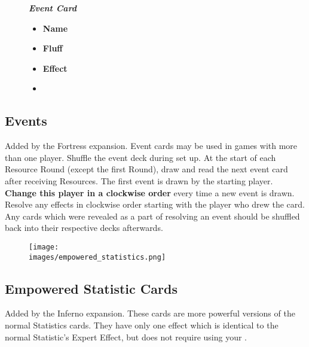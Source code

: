 \begin{wrapfigure}{r}{0.5\textwidth}
  \vspace{0pt}
  \centering
  \begin{scriptsize}
  \end{scriptsize}
  \break
  \footnotesize{\textbf{\textit{\textcolor{darkcandyapplered}{Event Card}}}}
  \scriptsize
  \begin{multicols}{2}
    \begin{itemize}
      \item[\textbf{1.}] \textbf{Name}
      \item[\textbf{2.}] \textbf{Fluff}
      \item[\textbf{3.}] \textbf{Effect}
      \item[\textbf{\phantom{.}}] \phantom{.}
    \end{itemize}
  \end{multicols}
\end{wrapfigure}
\subsection*{Events}
Added by the Fortress expansion.
Event cards may be used in games with more than one player.
Shuffle the event deck during set up.
At the start of each Resource Round (except the first Round), draw and read the next event card after receiving Resources.
The first event is drawn by the starting player.
\textbf{Change this player in a clockwise order} every time a new event is drawn.
Resolve any effects in clockwise order starting with the player who drew the card.
Any cards which were revealed as a part of resolving an event should be shuffled back into their respective decks afterwards.

\begin{wrapfigure}{r}{0.5\textwidth}
  \begin{center}
  \texttt{[image: \\images/empowered\_statistics.png]}
  \end{center}
\end{wrapfigure}
\subsection*{Empowered Statistic Cards}
Added by the Inferno expansion.
These cards are more powerful versions of the normal Statistics cards.
They have only one effect which is identical to the normal Statistic's Expert Effect, but does not require using your .


